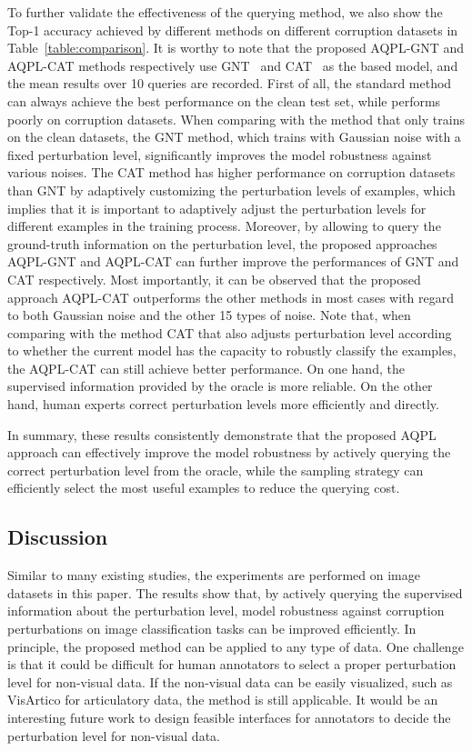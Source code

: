 \documentclass[letterpaper]{article} %
\begin{document}
To further validate the effectiveness of the querying method, we also show the Top-1 accuracy achieved by different methods on different corruption datasets in Table~\ref{table:comparison}. It is worthy to note that the proposed AQPL-GNT and AQPL-CAT methods respectively use GNT~\cite{rusak2020increasing} and CAT~\cite{cheng2020cat} as the based model, and the mean results over 10 queries are recorded. First of all, the standard method can always achieve the best performance on the clean test set, while performs poorly on corruption datasets. When comparing with the method that only trains on the clean datasets, the GNT method, which trains with Gaussian noise with a fixed perturbation level, significantly improves the model robustness against various noises. The CAT method has higher performance on corruption datasets than GNT by adaptively customizing the perturbation levels of examples, which implies that it is important to adaptively adjust the perturbation levels for different examples in the training process. Moreover, by allowing to query the ground-truth information on the perturbation level, the proposed approaches AQPL-GNT and AQPL-CAT can further improve the performances of GNT and CAT respectively. Most importantly, it can be observed that the proposed approach AQPL-CAT outperforms the other methods in most cases with regard to both Gaussian noise and the other 15 types of noise. Note that, when comparing with the method CAT that also adjusts perturbation level according to whether the current model has the capacity to robustly classify the examples, the AQPL-CAT can still achieve better performance. On one hand, the supervised information provided by the oracle is more reliable. On the other hand, human experts correct perturbation levels more efficiently and directly.

In summary, these results consistently demonstrate that the proposed AQPL approach can effectively improve the model robustness by actively querying the correct perturbation level from the oracle, while the sampling strategy can efficiently select the most useful examples to reduce the querying cost.


\subsection{Discussion}

Similar to many existing studies, the experiments are performed on image datasets in this paper. The results show that, by actively querying the supervised information about the perturbation level, model robustness against corruption perturbations on image classification tasks can be improved efficiently. In principle, the proposed method can be applied to any type of data. One challenge is that it could be difficult for human annotators to select a proper perturbation level for non-visual data. If the non-visual data can be easily visualized, such as VisArtico \cite{ouni2012visartico} for articulatory data, the method is still applicable. It would be an interesting future work to design feasible interfaces for annotators to decide the perturbation level for non-visual data. 
\end{document}
